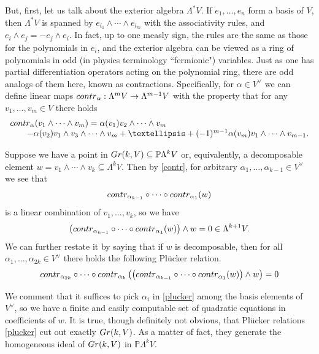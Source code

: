 \documentclass[11pt]{article}
\numberwithin{equation}{section}
\numberwithin{footnote}{section}
\newcommand{\blue}{\color{blue}}
\newcommand{\Gr}{{\rm Gr}}
\renewcommand{\P}{{\mathbb P}}
\begin{document}
\smallskip
But, first, let us talk about the exterior algebra $\Lambda^*V$. If $e_1,\ldots, e_n$ form a basis of $V$, then $\Lambda^* V$ is spanned by $e_{i_1}\wedge \cdots \wedge e_{i_m}$ with the associativity rules, and $e_i \wedge e_j = -e_j \wedge e_i$.
In fact, up to one measly sign, the rules are the same as those for the polynomials in $e_i$, and the exterior algebra can be viewed as a ring of polynomials in odd (in physics terminology ``fermionic") variables. Just as one has partial differentiation operators acting on the polynomial ring, there are odd analogs of them here, known as {\blue contractions}.
Specifically, for $\alpha\in V^\vee$ we can define linear maps ${\rm contr}_\alpha:\Lambda^m V \to \Lambda^{m-1} V$ with the property that
for any $v_1,\ldots, v_m\in V$ there holds
\begin{equation}\label{contr}
\begin{array}{l}
{\rm contr}_\alpha(v_1\wedge\cdots \wedge v_m) = 
\alpha(v_1) v_2 \wedge \cdots \wedge v_m \\
\hskip 20pt - \alpha(v_2) v_1 \wedge  v_3\wedge \cdots \wedge v_m +\ldots+
(-1)^{m-1} \alpha(v_m) v_1\wedge \cdots \wedge v_{m-1}.
\end{array}
\end{equation}

\smallskip
Suppose we have a point in $\Gr(k,V)\subseteq \P \Lambda^k V$ or, equivalently, a decomposable element 
$w=v_1\wedge \cdots \wedge v_k\subseteq  \Lambda^k V$. Then by \eqref{contr}, for arbitrary $\alpha_1,\ldots,\alpha_{k-1} \in V^{\vee}$ we see that
$$
{\rm contr}_{\alpha_{k-1}}\circ \cdots \circ {\rm contr}_{\alpha_1}(w)
$$
is a linear combination of $v_1,\ldots,v_k$, so we have 
$$
\left({\rm contr}_{\alpha_{k-1}}\circ \cdots \circ {\rm contr}_{\alpha_1}(w)\right)\wedge w = 0 \in \Lambda^{k+1} V.
$$
We can further restate it by saying that if $w$ is decomposable, then for all $\alpha_1,\ldots, \alpha_{2k}\in V^\vee$ there holds the following {\blue Pl\"ucker relation}.
\begin{equation}\label{plucker}
{\rm contr}_{\alpha_{2k}}\circ \cdots \circ {\rm contr}_{\alpha_k} \left(\left({\rm contr}_{\alpha_{k-1}}\circ \cdots \circ {\rm contr}_{\alpha_1}(w)\right)\wedge w \right)= 0
\end{equation}

\smallskip
We comment that it suffices to pick $\alpha_i$ in \eqref{plucker} among the basis elements of $V^{\vee}$, so we have a finite and  easily computable set of quadratic equations in coefficients of $w$. It is true, though definitely not obvious, that Pl\"ucker relations \eqref{plucker} cut out exactly $\Gr(k,V)$. As a matter of fact, they generate the homogeneous ideal of $\Gr(k,V)$ in $\P\Lambda^k V$.
\end{document}
